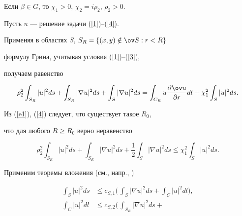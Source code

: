 \begin{pf}


Если $\beta \in G$, то $\chi_1>0$, $\chi_2=i\rho_2$, $\rho_2>0$.


Пусть $u$ --- решение задачи (\ref{1})--(\ref{4}).


Применяя в областях $S$, $S_R=\{(x,y)\notin \ov S: r<R\}$


формулу Грина, учитывая условия (\ref{1})--(\ref{3}), 


получаем равенство


\begin{equation}


\label{e1}


\rho_2^2\int_{S_R}|u|^2 ds + 


\int_{S_R}|\nabla u|^2 ds +


\int_{S}|\nabla u|^2 ds =


\int_{C_R} u\frac{\partial \ov u}{\partial r}dl +


\chi_1^2\int_{S}|u|^2 ds.


\end{equation} 


Из (\ref{e1}), (\ref{4}) следует, что существует такое $R_0$, 


что для любого $R\ge R_0$ верно неравенство


\begin{equation}


\label{ineq}


\rho_2^2\int_{S_R}|u|^2 ds + 


\int_{S_R}|\nabla u|^2 ds +


\frac{1}{2}\int_{S}|\nabla u|^2 ds \le


\chi_1^2\int_{S}|u|^2 ds.


\end{equation} 


Применим теоремы вложения (см., напр., \cite{199603140001})


\begin{align}


\label{embed1}


\int_{S}|u|^2 ds &\le c_{S,1}


\bigg(\,\int_{S}|\nabla u|^2 ds + 


\int_{C}|u|^2 dl\bigg),\\


\label{embed2}


\int_{C}|u|^2 dl&\le c_{S,2}


\bigg(\,\int_{S_R}|\nabla u|^2 ds + 



\end{align}
\end{pf}
